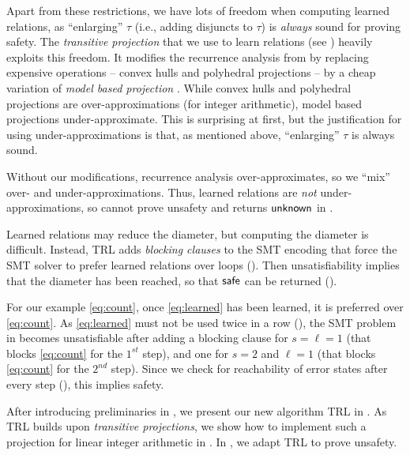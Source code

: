Apart from these restrictions, we have lots of freedom when computing learned relations, as ``enlarging'' $\tau$ (i.e., adding disjuncts to $\tau$) is \emph{always} sound for proving safety.
%
The \emph{transitive projection} that we use to learn relations (see ) heavily exploits this freedom.
%
It modifies the recurrence analysis from \cite{kincaid15} by replacing expensive operations -- convex hulls and polyhedral projections -- by a cheap variation of \emph{model based projection} \cite{spacer}.
%
While convex hulls and polyhedral projections are over-approximations (for integer arithmetic), model based projections under-approximate.
%
This is surprising at first, but the justification for using under-approximations is that, as mentioned above, ``enlarging'' $\tau$ is always sound.

Without our modifications, recurrence analysis over-approximates, so we ``mix'' over- and under-approximations.
%
Thus, learned relations are \emph{not} under-approximations, so  cannot prove unsafety and returns $\mathsf{unknown}$ in .

Learned relations may reduce the diameter, but computing the diameter\paper{\pagebreak[3]} is difficult.
%
Instead, TRL adds \emph{blocking clauses} to the SMT encoding that force the SMT solver to prefer learned relations over loops ().
%
Then unsatisfiability implies that the diameter has been reached, so that $\mathsf{safe}$ can be returned ().

For our example \eqref{eq:count}, once \eqref{eq:learned} has been learned, it is preferred over \eqref{eq:count}.
%
As \eqref{eq:learned} must not be used twice in a row (), the SMT problem in  becomes unsatisfiable after adding a blocking clause for $s = \ell = 1$ (that blocks \eqref{eq:count} for the $1^{st}$ step), and one for $s = 2$ and $\ell = 1$ (that blocks \eqref{eq:count} for the $2^{nd}$ step).
%
Since we check for reachability of error states after every step (), this implies safety.


After introducing preliminaries in , we present our new algorithm
TRL in .
%
As TRL builds upon \emph{transitive projections}, we show how to implement such a
projection for linear integer arithmetic in .
In , we adapt TRL to prove unsafety.
%
